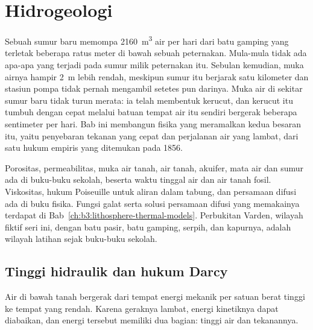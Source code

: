 \chapter{Hidrogeologi}\label{ch:b3:hydrogeology}

Sebuah sumur baru memompa \qty{2160}{m^3} air per hari dari batu gamping
yang terletak beberapa ratus meter di bawah sebuah peternakan. Mula-mula tidak ada
apa-apa yang terjadi pada sumur milik peternakan itu. Sebulan kemudian, muka airnya
hampir \qty{2}{m} lebih rendah, meskipun sumur itu berjarak satu kilometer dan stasiun pompa tidak pernah mengambil setetes pun darinya. Muka air di sekitar
sumur baru tidak turun merata: ia telah membentuk
kerucut, dan kerucut itu tumbuh dengan cepat melalui batuan tempat air
itu sendiri bergerak beberapa sentimeter per hari. Bab ini membangun fisika yang
meramalkan kedua besaran itu, yaitu penyebaran tekanan yang cepat dan
perjalanan air yang lambat, dari satu hukum empiris yang ditemukan pada 1856.

\begin{recall}
Porositas, permeabilitas, muka air tanah, air tanah, akuifer, mata air
dan sumur ada di buku-buku sekolah, beserta waktu tinggal air dan
air tanah fosil. Viskositas, hukum Poiseuille untuk aliran dalam tabung,
dan persamaan difusi ada di buku fisika. Fungsi galat
serta solusi persamaan difusi yang memakainya terdapat di
Bab~\ref{ch:b3:lithosphere-thermal-models}. Perbukitan Varden, wilayah fiktif seri ini,
dengan batu pasir, batu gamping, serpih, dan kapurnya,
adalah wilayah latihan sejak buku-buku sekolah.
\end{recall}

\section{Tinggi hidraulik dan hukum Darcy}\label{sec:b3:hydrogeology:darcy}

Air di bawah tanah bergerak dari tempat energi mekanik per satuan berat
tinggi ke tempat yang rendah. Karena geraknya lambat, energi kinetiknya
dapat diabaikan, dan energi tersebut memiliki dua bagian: tinggi air dan
tekanannya.

